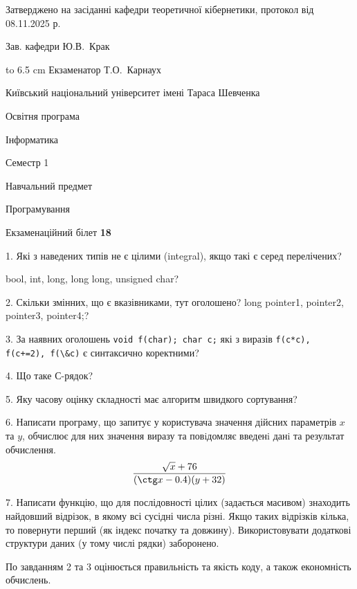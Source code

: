 \documentclass[12pt, ukrainian]{article}
\def\code#1{\Verb!#1!}
\begin{document}
{\smallskip\smallskip \begin {scriptsize} Затверджено на засіданні кафедри теоретичної кібернетики, протокол   від   08.11.2025 р.\par\smallskip\smallskip\smallskip\smallskip
{\parbox {6.5 cm} {Зав. кафедри \dotfill Ю.В.~Крак}}\hspace {0.7cm} {\hbox to 6.5 cm { Екзаменатор \dotfill Т.О.~Карнаух}} \end{scriptsize}}
\vspace{0.9cm}
{{\begin {scriptsize}\par
{ \center  Київський національний університет імені Тараса Шевченка \par}
{\parbox {5 cm}{Освітня програма \hfill}{\parbox {7 cm}{Інформатика\hfill}}\parbox {6 cm}{\hfill Семестр 1}}\par
{\parbox {5 cm} {Навчальний предмет \hfill}\parbox {7 cm}{Програмування \hfill}\parbox {6cm}{\hfill}\par}\vspace{-15pt} \end{scriptsize}}{\center Екзаменаційний білет \No \textbf { 18 }\par}}
{%
1. Які з наведених типів не є цілими (integral), якщо такі є серед перелічених?

bool, int, long, long long, unsigned char?
\par
\vspace{2mm}
2. Скільки змінних, що є вказівниками, тут оголошено?
long pointer1, pointer2, pointer3, pointer4;?
\par
\vspace{2mm}
3. За наявних оголошень \code{void f(char); char c;} які з виразів \code{f(c*c), f(c+=2), f(\&c)} є синтаксично коректними?
\par
\vspace{2mm}
4. Що таке С-рядок?
\par
\vspace{2mm}
5. Яку часову оцінку складності має алгоритм швидкого сортування?
\par
\vspace{2mm}
6. Написати програму, що запитує у користувача значення дійсних параметрів $x$ та $y$, обчислює для них значення виразу та повiдомляє введенi данi та результат обчислення.
$$\frac{\sqrt x + 76}{(\ctg x - 0.4) (y + 32)}$$ 

\par
7. Написати функцію, що для послідовності цілих (задається масивом) знаходить найдовший відрізок, в якому всі сусідні числа різні. Якщо таких відрізків кілька, то повернути перший (як індекс початку та довжину). Використовувати додаткові структури даних (у тому числі рядки) заборонено.

По завданням 2 та 3 оцінюється правильність та якість коду, а також економність обчислень.

}
\end{document}
